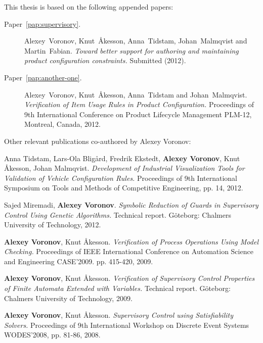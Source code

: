 
\begin{refsection}

This thesis is based on the following appended papers:

\cite{alexandersson_analysis_2021}

\begin{description}
\item[Paper~\ref{pap:supervisory}.]

Alexey~Voronov, Knut~Åkesson, Anna~Tidstam, Johan~Malmqvist and Martin~Fabian. \emph{Toward better support for authoring and maintaining product configuration constraints.} Submitted (2012).

\item[Paper~\ref{pap:another-one}.] Alexey~Voronov, Knut~Åkesson, Anna~Tidstam and Johan~Malmqvist. \emph{Verification of Item Usage Rules in Product Configuration.} Proceedings of 9th International Conference on Product Lifecycle Management PLM-12, Montreal, Canada, 2012.
\end{description}

\vspace{1cm}

\noindent Other relevant publications co-authored by Alexey Voronov:
\begin{description}
\normalsize
\newcommand{\ME}{{\bfseries Alexey Voronov}}

\item Anna Tidstam, Lars-Ola Bligård, Fredrik Ekstedt, \ME, Knut Åkesson, Johan Malmqvist. \emph{Development of Industrial Visualization Tools for Validation of Vehicle Configuration Rules.} Proceedings of 9th International Symposium on Tools and Methods of Competitive Engineering, pp. 14, 2012.

\item Sajed Miremadi, \ME. \emph{Symbolic Reduction of Guards in Supervisory Control Using Genetic Algorithms.} Technical report. Göteborg: Chalmers University of Technology, 2012.

\item \ME, Knut Åkesson. \emph{Verification of Process Operations Using Model Checking.} Proceedings of IEEE International Conference on Automation Science and Engineering CASE'2009. pp. 415-420, 2009.

\item \ME, Knut Åkesson. \emph{Verification of Supervisory Control Properties of Finite Automata Extended with Variables.} Technical report. Göteborg: Chalmers University of Technology, 2009.

\item \ME, Knut Åkesson. \emph{Supervisory Control using Satisfiability Solvers.} Proceedings of 9th International Workshop on Discrete Event Systems WODES'2008, pp. 81-86, 2008.
\end{description}

\end{refsection}
